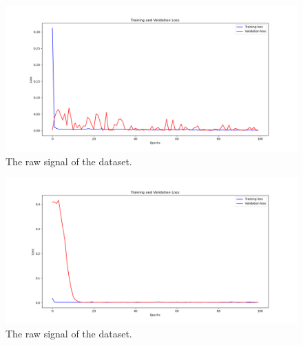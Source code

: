 \begin{figure}[H]
    \centering
    \begin{minipage}[b]{1\textwidth}
        \includegraphics[width=\textwidth]{manuscript/src/figures/Ass4/Ass4_Q2b_Training and Validation Loss.png}
    \end{minipage}
    \caption{The raw signal of the dataset.}
    \label{fig:Ass4_Q2b_Training}
\end{figure}

\begin{figure}[H]
    \centering
    \begin{minipage}[b]{1\textwidth}
        \includegraphics[width=\textwidth]{manuscript/src/figures/Ass4/Ass4_Q2c_Training and Validation Loss.png}
    \end{minipage}
    \caption{The raw signal of the dataset.}
    \label{fig:Ass4_Q2c_Training}
\end{figure}












